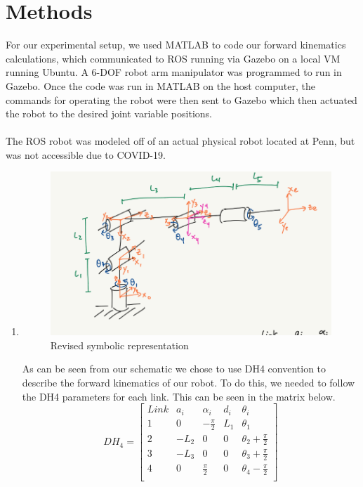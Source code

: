 \documentclass[12pt]{article}
\begin{document}
\section{Methods}
For our experimental setup, we used MATLAB to code our forward kinematics calculations, which communicated to ROS running via Gazebo on a local VM running Ubuntu. A 6-DOF robot arm manipulator was programmed to run in Gazebo. Once the code was run in MATLAB on the host computer, the commands for operating the robot were then sent to Gazebo which then actuated the robot to the desired joint variable positions. \\ \\
The ROS robot was modeled off of an actual physical robot located at Penn, but was not accessible due to COVID-19.
\begin{enumerate}
\item \begin{figure} [h]
	\centering 
	\includegraphics[scale=1]{Q1.png}
	\caption{Revised symbolic representation}
	\end{figure}
\par{ As can be seen from our schematic we chose to use DH4 convention to describe the forward kinematics of our robot.
To do this, we needed to follow the DH4 parameters for each link. This can be seen in the matrix below.}
\begin{equation}
	DH_{4} = \begin{bmatrix}
	Link & a_{i} & \alpha_{i} &d_{i} &\theta_{i}\\
	1&0 & -\frac{\pi}{2} & L_{1}&  \theta_{1}\\
	2&-L_{2}  & 0 & 0 &  \theta_{2}+\frac{\pi}{2}\\
	3&-L_{3} & 0 & 0 & \theta_{3}+\frac{\pi}{2}\\
	4&0 & \frac{\pi}{2} & 0 & \theta_{4}-\frac{\pi}{2}\\

\end{bmatrix}
\end{equation}
\end{enumerate}
\end{document}
